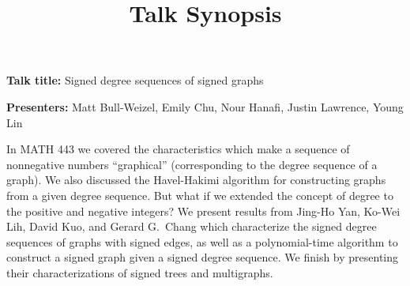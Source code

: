 \documentclass[12pt]{article}
\title{Talk Synopsis}
\begin{document}
\maketitle

\textbf{Talk title:} Signed degree sequences of signed graphs

\textbf{Presenters:} Matt Bull-Weizel, Emily Chu, Nour Hanafi, Justin Lawrence,
Young Lin

\medskip

In MATH 443 we covered the characteristics which make a sequence of nonnegative
numbers ``graphical'' (corresponding to the degree sequence of a graph). We
also discussed the Havel-Hakimi algorithm for constructing graphs from a given
degree sequence. But what if we extended the concept of degree to the positive
and negative integers? We present results from Jing-Ho Yan, Ko-Wei Lih, David
Kuo, and Gerard G.\ Chang which characterize the signed degree sequences of
graphs with signed edges, as well as a polynomial-time algorithm to construct a
signed graph given a signed degree sequence. We finish by presenting their
characterizations of signed trees and multigraphs.
\end{document}
